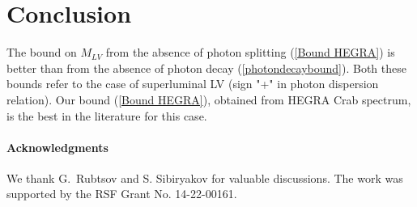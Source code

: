 \documentclass{webofc}
\begin{document}
\section{Conclusion}
\label{Conclusion}
The bound on $M_{LV}$ from the absence of photon splitting (\ref{Bound HEGRA}) is better than from the absence of photon decay (\ref{photondecaybound}). Both these bounds refer to the case of superluminal LV (sign "+" in photon dispersion relation). Our bound (\ref{Bound HEGRA}), obtained from HEGRA Crab spectrum, is the best in the literature for this case.

\paragraph*{Acknowledgments}
We thank G.~Rubtsov and S. Sibiryakov for valuable discussions. The
work was supported by the RSF Grant No. 14-22-00161.
\end{document}
